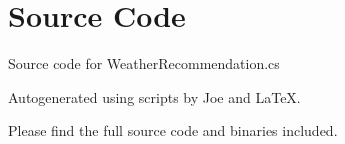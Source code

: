 \documentclass[12pt]{article}
\begin{document}
\maketitle
\pagebreak


\section{Source Code}

Source code for \textsf{WeatherRecommendation.cs}


\newpage



\newpage

Autogenerated using scripts by Joe and \LaTeX.

Please find the full source code and binaries included.
\end{document}
